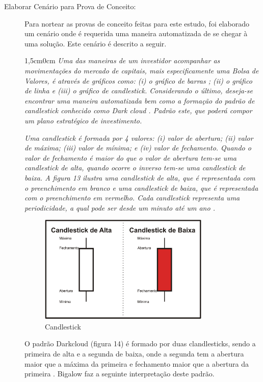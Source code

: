 \begin{description}
\item [Elaborar Cenário para Prova de Conceito:]
Para nortear as provas de conceito feitas para este estudo, foi elaborado um cenário onde é requerida uma maneira automatizada de se chegar à uma solução. Este cenário é descrito a seguir.

\begin{adjustwidth}{1,5cm}{0cm}
\textit{Uma das maneiras de um investidor acompanhar as movimentações do mercado de capitais, mais especificamente uma Bolsa de Valores, é através de gráficos como: (i) o gráfico de barras ; (ii) o gráfico de linha  e (iii) o gráfico de candlestick\cite[p. 5-6]{matsura2006}. Considerando o último, deseja-se encontrar uma maneira automatizada bem como a formação do padrão de candlestick conhecido como Dark cloud \cite[p.61]{matsura2006}. Padrão este, que poderá compor um plano estratégico de investimento.}

\textit{Uma candlestick é formada por 4 valores: (i) valor de abertura; (ii) valor de máxima; (iii) valor de mínima; e (iv) valor de fechamento. Quando o valor de  fechamento é maior do que o valor de abertura tem-se uma candlestick de alta, quando ocorre o inverso tem-se uma candlestick de baixa. A figura 13 ilustra uma candlestick de alta, que é representada com o preenchimento em branco e uma candlestick de baixa, que é representada com o preenchimento em vermelho. Cada candlestick representa uma periodicidade, a qual pode ser desde um minuto até um ano \cite[p.6]{matsura2006}.}
\end{adjustwidth}

\begin{figure}[h!]
\centering
\label{f13} 
\includegraphics[width=0.8\textwidth]{figuras/f10}
\caption{Candlestick }
\end{figure}

O padrão Darkcloud (figura 14) é formado por duas clandlesticks, sendo a primeira de alta e a segunda de baixa, onde a segunda tem a abertura maior que a máxima da primeira e fechamento maior que a abertura da primeira \cite[p.61]{matsura2006}. Bigalow faz a seguinte interpretação deste padrão.


\end{description}
